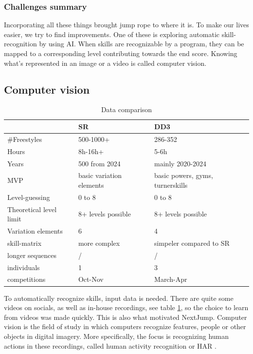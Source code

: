 \subsubsection{Challenges summary}
Incorporating all these things brought jump rope to where it is. To make our lives easier, we try to find improvements. One of these is exploring automatic skill-recognition by using AI. When skills are recognizable by a program, they can be mapped to a corresponding level contributing towards the end score. Knowing what's represented in an image or a video is called computer vision. %

\subsection{Computer vision}
\label{subsec:literature-computer-vision}

\begin{table}[t]
    \centering
    \begin{tabular}{|l|l|l|}
        \hline
        & SR & DD3 \\ \hline
        \#Freestyles & 500-1000+ & 286-352 \\ \hline
        Hours & 8h-16h+ & 5-6h \\ \hline
        Years & 500 from 2024 & mainly 2020-2024 \\ \hline
        MVP & basic variation elements & basic powers, gyms, turnerskills \\ \hline
        Level-guessing & 0 to 8 & 0 to 8 \\ \hline
        Theoretical level limit & 8+ levels possible & 8+ levels possible \\ \hline
        Variation elements & 6 & 4 \\ \hline
        skill-matrix & more complex & simpeler compared to SR \\ \hline
        longer sequences & / & / \\ \hline
        individuals & 1 & 3 \\ \hline
        competitions & Oct-Nov & March-Apr \\ \hline
    \end{tabular}
    \caption{Data comparison}
    \label{tbl:data-comparison}
\end{table}

To automatically recognize skills, input data is needed. There are quite some videos on socials, as well as in-house recordings, see table \ref{tbl:data-comparison}, so the choice to learn from videos was made quickly. This is also what motivated NextJump.
Computer vision is the field of study in which computers recognize features, people or other objects in digital imagery. More specifically, the focus is recognizing human actions in these recordings, called human activity recognition or HAR \autocite{Pareek_2020}.

